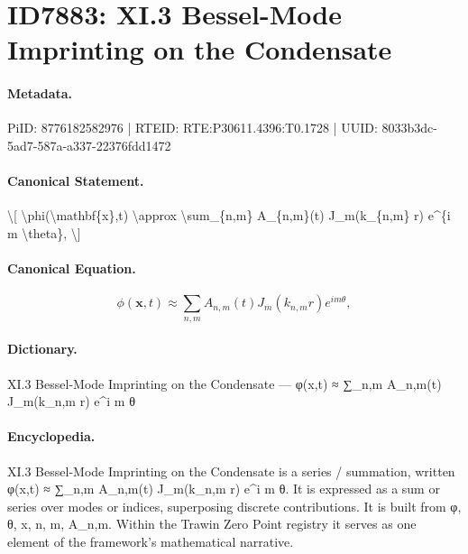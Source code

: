 \section*{ID7883: XI.3 Bessel-Mode Imprinting on the Condensate}
\paragraph{Metadata.}
PiID: 8776182582976 | RTEID: RTE:P30611.4396:T0.1728 | UUID: 8033b3dc-5ad7-587a-a337-22376fdd1472

\paragraph{Canonical Statement.}
\textbackslash{}[ \textbackslash{}phi(\textbackslash{}mathbf\{x\},t) \textbackslash{}approx \textbackslash{}sum\_\{n,m\} A\_\{n,m\}(t) J\_m(k\_\{n,m\} r) e\textasciicircum{}\{i m \textbackslash{}theta\}, \textbackslash{}]

\paragraph{Canonical Equation.}
\[
\phi(\mathbf{x},t) \approx \sum_{n,m} A_{n,m}(t) J_m(k_{n,m} r) e^{i m \theta},
\]

\paragraph{Dictionary.}
XI.3 Bessel-Mode Imprinting on the Condensate — φ(x,t) ≈ ∑\_n,m A\_n,m(t) J\_m(k\_n,m r) e\textasciicircum{}i m θ

\paragraph{Encyclopedia.}
XI.3 Bessel-Mode Imprinting on the Condensate is a series / summation, written φ(x,t) ≈ ∑\_n,m A\_n,m(t) J\_m(k\_n,m r) e\textasciicircum{}i m θ. It is expressed as a sum or series over modes or indices, superposing discrete contributions. It is built from φ, θ, x, n, m, A\_n,m. Within the Trawin Zero Point registry it serves as one element of the framework's mathematical narrative.
